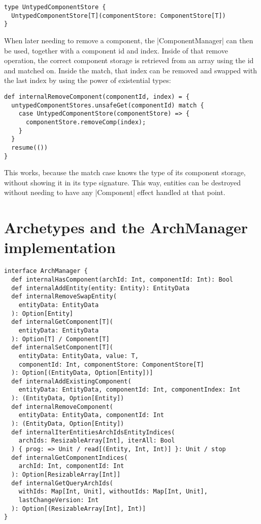 \begin{lstlisting}[caption=UntypedComponentStore existential type]
type UntypedComponentStore {
  UntypedComponentStore[T](componentStore: ComponentStore[T])
}
\end{lstlisting}

When later needing to remove a component, the |ComponentManager| can then be used, together with a component id and index. Inside of that remove operation, the correct component storage is retrieved from an array using the id and matched on. Inside the match, that index can be removed and swapped with the last index by using the power of existential types:

\begin{lstlisting}[caption=Component remove operation]
def internalRemoveComponent(componentId, index) = {
  untypedComponentStores.unsafeGet(componentId) match {
    case UntypedComponentStore(componentStore) => {
      componentStore.removeComp(index);
    }
  }
  resume(())
}
\end{lstlisting}

This works, because the match case knows the type of its component storage, without showing it in its type signature. This way, entities can be destroyed without needing to have any |Component| effect handled at that point.

\section{Archetypes and the ArchManager implementation}

\begin{lstlisting}[caption=ArchManager signiture]
interface ArchManager {
  def internalHasComponent(archId: Int, componentId: Int): Bool
  def internalAddEntity(entity: Entity): EntityData
  def internalRemoveSwapEntity(
    entityData: EntityData
  ): Option[Entity]
  def internalGetComponent[T](
    entityData: EntityData
  ): Option[T] / Component[T]
  def internalSetComponent[T](
    entityData: EntityData, value: T,
	componentId: Int, componentStore: ComponentStore[T]
  ): Option[(EntityData, Option[Entity])]
  def internalAddExistingComponent(
    entityData: EntityData, componentId: Int, componentIndex: Int
  ): (EntityData, Option[Entity])
  def internalRemoveComponent(
    entityData: EntityData, componentId: Int
  ): (EntityData, Option[Entity])
  def internalIterEntitiesArchIdsEntityIndices(
    archIds: ResizableArray[Int], iterAll: Bool
  ) { prog: => Unit / read[(Entity, Int, Int)] }: Unit / stop
  def internalGetComponentIndices(
    archId: Int, componentId: Int
  ): Option[ResizableArray[Int]]
  def internalGetQueryArchIds(
    withIds: Map[Int, Unit], withoutIds: Map[Int, Unit],
	lastChangeVersion: Int
  ): Option[(ResizableArray[Int], Int)]
}
\end{lstlisting}

